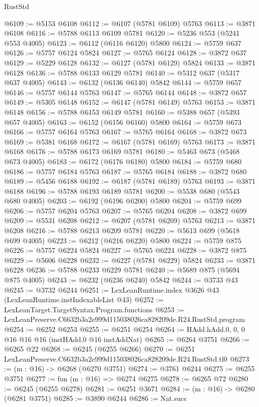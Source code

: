\begin{lexlean}{RustStd}
\begin{coremodule}
@6109 := @5153 @6108
@6112 := @6107 (@5781 @6109) @5763
@6113 := @3871 @6108
@6116 := @5788 @6113 @6109 @5781
@6120 := @5236 @553 (@5241 @553 @4005)
@6123 := @6112 (@6116 @6120) @5800
@6124 := @5759 @637
@6126 := @5757 @6124 @5824
@6127 := @5765 @6124
@6128 := @3872 @637
@6129 := @5229 @6128
@6132 := @6127 (@5781 @6129) @5824
@6133 := @3871 @6128
@6136 := @5788 @6133 @6129 @5781
@6140 := @5312 @637 (@5317 @637 @4005)
@6143 := @6132 (@6136 @6140) @5842
@6144 := @5759 @657
@6146 := @5757 @6144 @5763
@6147 := @5765 @6144
@6148 := @3872 @657
@6149 := @5305 @6148
@6152 := @6147 (@5781 @6149) @5763
@6153 := @3871 @6148
@6156 := @5788 @6153 @6149 @5781
@6160 := @5388 @657 (@5393 @657 @4005)
@6163 := @6152 (@6156 @6160) @5800
@6164 := @5759 @673
@6166 := @5757 @6164 @5763
@6167 := @5765 @6164
@6168 := @3872 @673
@6169 := @5381 @6168
@6172 := @6167 (@5781 @6169) @5763
@6173 := @3871 @6168
@6176 := @5788 @6173 @6169 @5781
@6180 := @5463 @673 (@5468 @673 @4005)
@6183 := @6172 (@6176 @6180) @5800
@6184 := @5759 @680
@6186 := @5757 @6184 @5763
@6187 := @5765 @6184
@6188 := @3872 @680
@6189 := @5456 @6188
@6192 := @6187 (@5781 @6189) @5763
@6193 := @3871 @6188
@6196 := @5788 @6193 @6189 @5781
@6200 := @5538 @680 (@5543 @680 @4005)
@6203 := @6192 (@6196 @6200) @5800
@6204 := @5759 @699
@6206 := @5757 @6204 @5763
@6207 := @5765 @6204
@6208 := @3872 @699
@6209 := @5531 @6208
@6212 := @6207 (@5781 @6209) @5763
@6213 := @3871 @6208
@6216 := @5788 @6213 @6209 @5781
@6220 := @5613 @699 (@5618 @699 @4005)
@6223 := @6212 (@6216 @6220) @5800
@6224 := @5759 @875
@6226 := @5757 @6224 @5824
@6227 := @5765 @6224
@6228 := @3872 @875
@6229 := @5606 @6228
@6232 := @6227 (@5781 @6229) @5824
@6233 := @3871 @6228
@6236 := @5788 @6233 @6229 @5781
@6240 := @5689 @875 (@5694 @875 @4005)
@6243 := @6232 (@6236 @6240) @5842
@6244 := @3733 @43
@6245 := @3732 @6244
@6251 := LexLeanRuntime.index @3626 @43 (LexLeanRuntime.instIndexableList @43)
@6252 := LexLeanTarget.TargetSyntax.Program.functions
@6253 := LexLeanPreserve.C6632b3a2e999d115038026ca828209de.R24.RustStd.program
@6254 := @6252 @6253
@6255 := @6251 @6254
@6264 := HAdd.hAdd.{0, 0, 0} @16 @16 @16 (instHAdd.{0} @16 instAddNat)
@6265 := @6264 @3751
@6266 := @6265 @22
@6268 := @6245 (@6255 @6266)
@6270 := @6251 LexLeanPreserve.C6632b3a2e999d115038026ca828209de.R24.RustStd.tl0
@6273 := (m : @16) -> @6268 (@6270 @3751)
@6274 := @3761 @6244
@6275 := @6255 @3751
@6277 := fun (m : @16) => @6274 @6275
@6278 := @6265 @72
@6280 := @6245 (@6255 @6278)
@6281 := @6251 @3671
@6284 := (m : @16) -> @6280 (@6281 @3751)
@6285 := @3890 @6244
@6286 := Nat.succ

\end{coremodule}
\end{lexlean}
